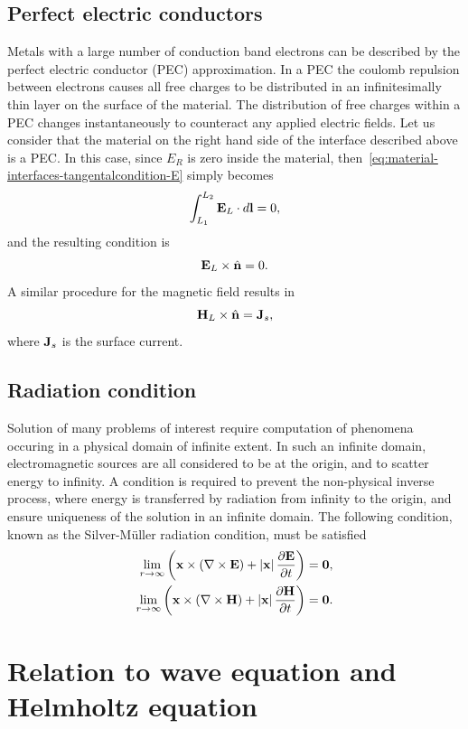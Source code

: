 \subsection{Perfect electric conductors}
Metals with a large number of conduction band electrons can be described by the
perfect electric conductor (PEC) approximation. In a PEC the coulomb repulsion
between electrons causes all free charges to be distributed in an
infinitesimally thin layer on the surface of the material. The distribution of
free charges within a PEC changes instantaneously to counteract any applied
electric fields. Let us consider that the material on the right hand side of the
interface described above is a PEC. In this case, since $E_R$ is zero inside the
material, then~\eqref{eq:material-interfaces-tangentalcondition-E} simply
becomes
$$
\int_{L_1}^{L_2} \mathbf{E}_L \cdot d\mathbf{l} = 0 ,
$$
and the resulting condition is
$$
\mathbf{E}_L \times \hat{\mathbf{n}} = 0 .
$$
A similar procedure for the magnetic field results in
$$
\mathbf{H}_L \times \hat{\mathbf{n}} = \mathbf{J}_s ,
$$
where $\mathbf{J}_s$ is the surface current.

\subsection{Radiation condition}
Solution of many problems of interest require computation of phenomena occuring
in a physical domain of infinite extent. In such an infinite domain, electromagnetic
sources are all considered to be at the origin, and to scatter energy to infinity.
A condition is required to prevent the non-physical inverse process, where energy
is transferred by radiation from infinity to the origin, and ensure uniqueness of
the solution in an infinite domain. The following condition,
known as the Silver-M\"uller radiation condition, must be satisfied
\begin{align}
  \lim_{ r \to \infty } \left( \mathbf{x} \times \left( \nabla \times \mathbf{E} \right) + \left| \mathbf{x} \right| \frac{\partial \mathbf{E}}{\partial t} \right) = \mathbf{0}, \\
  \lim_{ r \to \infty } \left( \mathbf{x} \times \left( \nabla \times \mathbf{H} \right) + \left| \mathbf{x} \right| \frac{\partial \mathbf{H}}{\partial t} \right) = \mathbf{0}.
\end{align}

\section{Relation to wave equation and Helmholtz equation}
